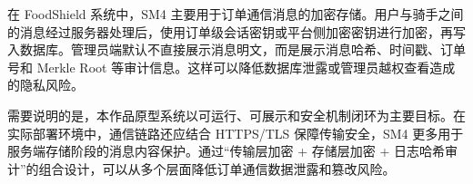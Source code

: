 

在 FoodShield 系统中，SM4 主要用于订单通信消息的加密存储。用户与骑手之间的消息经过服务器处理后，使用订单级会话密钥或平台侧加密密钥进行加密，再写入数据库。管理员端默认不直接展示消息明文，而是展示消息哈希、时间戳、订单号和 Merkle Root 等审计信息。这样可以降低数据库泄露或管理员越权查看造成的隐私风险。

需要说明的是，本作品原型系统以可运行、可展示和安全机制闭环为主要目标。在实际部署环境中，通信链路还应结合 HTTPS/TLS 保障传输安全，SM4 更多用于服务端存储阶段的消息内容保护。通过“传输层加密 + 存储层加密 + 日志哈希审计”的组合设计，可以从多个层面降低订单通信数据泄露和篡改风险。

